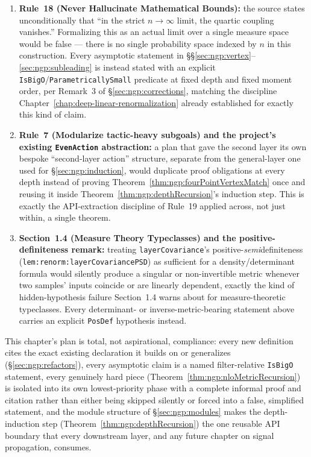 \begin{enumerate}
  \item \textbf{Rule~18 (Never Hallucinate Mathematical Bounds):} the source states unconditionally
    that ``in the strict $n\to\infty$ limit, the quartic coupling vanishes.'' Formalizing this as an
    actual limit over a single measure space would be false — there is no single probability space
    indexed by $n$ in this construction. Every asymptotic statement in
    \S\S\ref{sec:ngp:vertex}--\ref{sec:ngp:subleading} is instead stated with an explicit
    \texttt{IsBigO}/\texttt{ParametricallySmall} predicate at fixed depth and fixed moment order,
    per Remark~3 of \S\ref{sec:ngp:corrections}, matching the discipline
    Chapter~\ref{chap:deep-linear-renormalization} already established for exactly this kind of
    claim.
  \item \textbf{Rule~7 (Modularize tactic-heavy subgoals) and the project's existing
    \texttt{EvenAction} abstraction:} a plan that gave the second layer its own bespoke
    ``second-layer action'' structure, separate from the general-layer one used for
    \S\ref{sec:ngp:induction}, would duplicate proof obligations at every depth instead of proving
    Theorem~\ref{thm:ngp:fourPointVertexMatch} once and reusing it inside
    Theorem~\ref{thm:ngp:depthRecursion}'s induction step. This is exactly the API-extraction
    discipline of Rule~19 applied across, not just within, a single theorem.
  \item \textbf{Section~1.4 (Measure Theory Typeclasses) and the positive-definiteness remark:}
    treating \texttt{layerCovariance}'s positive-\emph{semi}definiteness
    (\texttt{lem:renorm:layerCovariancePSD}) as sufficient for a density/determinant formula would
    silently produce a singular or non-invertible metric whenever two samples' inputs coincide or
    are linearly dependent, exactly the kind of hidden-hypothesis failure Section~1.4 warns about
    for measure-theoretic typeclasses. Every determinant- or inverse-metric-bearing statement above
    carries an explicit \texttt{PosDef} hypothesis instead.
\end{enumerate}

This chapter's plan is total, not aspirational, compliance: every new definition cites the exact
existing declaration it builds on or generalizes (\S\ref{sec:ngp:refactors}), every asymptotic
claim is a named filter-relative \texttt{IsBigO} statement, every genuinely hard piece
(Theorem~\ref{thm:ngp:nloMetricRecursion}) is isolated into its own lowest-priority phase with a
complete informal proof and citation rather than either being skipped silently or forced into a
false, simplified statement, and the module structure of \S\ref{sec:ngp:modules} makes the
depth-induction step (Theorem~\ref{thm:ngp:depthRecursion}) the one reusable API boundary that
every downstream layer, and any future chapter on signal propagation, consumes.
